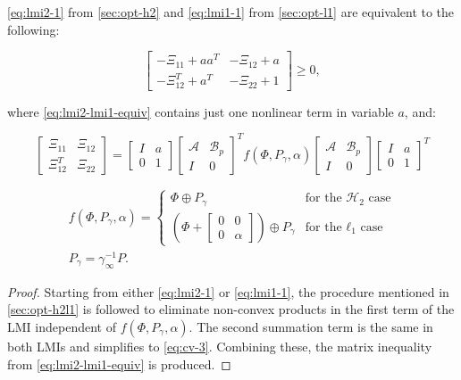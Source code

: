 \begin{thm}
	\autoref{eq:lmi2-1} from \autoref{sec:opt-h2} and \autoref{eq:lmi1-1} from \autoref{sec:opt-l1} are equivalent to the following:
	
	\begin{equation} \label{eq:lmi2-lmi1-equiv}
		\begin{bmatrix}
			-\Xi_{11} + aa^T & -\Xi_{12} + a \\
			-\Xi_{12}^T + a^T & -\Xi_{22} + 1
		\end{bmatrix} \geq 0,
	\end{equation}
	
	where \autoref{eq:lmi2-lmi1-equiv} contains just one nonlinear term in variable $a$, and:
	\vspace{-0.25cm} %

	\begin{equation*}
		\begin{bmatrix}
			\Xi_{11} & \Xi_{12} \\
			\Xi_{12}^T & \Xi_{22}
		\end{bmatrix} =
		\begin{bmatrix}
			I & a \\
			0 & 1
		\end{bmatrix}
		\begin{bmatrix}
			\mathcal{A} & \mathcal{B}_p \\
			I & 0
		\end{bmatrix}^T
		f\left(\Phi, P_\gamma, \alpha\right)
		\begin{bmatrix}
			\mathcal{A} & \mathcal{B}_p \\
			I & 0
		\end{bmatrix} 
		\begin{bmatrix}
			I & a \\
			0 & 1
		\end{bmatrix}^T
	\end{equation*}

	\begin{gather} \label{eq:pq}
		f\left(\Phi, P_\gamma, \alpha\right) = 
		\begin{cases}
			\Phi \oplus P_\gamma & \textrm{for the $\mathcal{H}_2$ case} \\
			\left(\Phi + \begin{bmatrix} 0 & 0 \\ 0 & \alpha \end{bmatrix}\right) \oplus P_\gamma & \textrm{for the $\ell_1$ case}
		\end{cases} \\
		P_\gamma = \gamma_\infty^{-1}P.
	\end{gather}
\end{thm}

\begin{proof}
	Starting from either \autoref{eq:lmi2-1} or \autoref{eq:lmi1-1}, the procedure mentioned in \autoref{sec:opt-h2l1} is followed to eliminate non-convex products in the first term of the \gls{LMI} independent of $f\left(\Phi, P_\gamma, \alpha\right)$. The second summation term is the same in both \gls{LMI}s and simplifies to \autoref{eq:cv-3}. Combining these, the matrix inequality from \autoref{eq:lmi2-lmi1-equiv} is produced.
\end{proof}